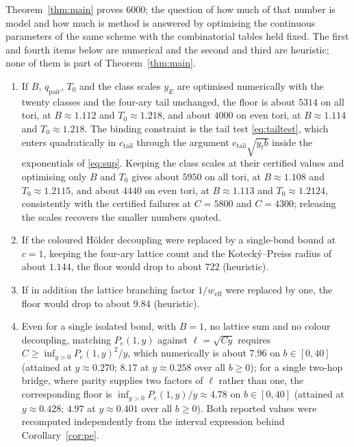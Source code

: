 \documentclass[11pt]{article}
\theoremstyle{plain}
\theoremstyle{definition}
\begin{document}
Theorem~\ref{thm:main} proves $6000$; the question of how much of that number is
model and how much is method is answered by optimising the continuous parameters of
the same scheme with the combinatorial tables held fixed. The first and fourth items
below are numerical and the second and third are heuristic; none of them is part of
Theorem~\ref{thm:main}.

\begin{enumerate}
\item If $B$, $q_{\mathrm{pair}}$, $T_0$ and the class scales $y_E$ are optimised
numerically with the twenty classes and the four-ary tail unchanged, the floor is
about $5314$ on all tori, at $B\approx1.112$ and $T_0\approx1.218$, and about $4000$
on even tori, at $B\approx1.114$ and $T_0\approx1.218$. The binding constraint is the
tail test \eqref{eq:tailtest}, which enters quadratically in $c_{\mathrm{tail}}$
through the argument $c_{\mathrm{tail}}\sqrt{y_tb}$ inside the exponentials of
\eqref{eq:sup}. Keeping the class scales at their certified values and optimising
only $B$ and $T_0$ gives about $5950$ on all tori, at $B\approx1.108$ and
$T_0\approx1.2115$, and about $4440$ on even tori, at $B\approx1.113$ and
$T_0\approx1.2124$, consistently with the certified failures at $C=5800$ and
$C=4300$; releasing the scales recovers the smaller numbers quoted.
\item If the coloured H\"older decoupling were replaced by a single-bond bound at
$c=1$, keeping the four-ary lattice count and the Koteck\'y--Preiss radius of about
$1.144$, the floor would drop to about $722$ (heuristic).
\item If in addition the lattice branching factor $1/w_{\mathrm{eff}}$ were replaced
by one, the floor would drop to about $9.84$ (heuristic).
\item Even for a single isolated bond, with $B=1$, no lattice sum and no colour
decoupling, matching $P_e(1,y)$ against $\ell=\sqrt{Cy}$ requires
$C\ge\inf_{y>0}P_e(1,y)^{2}/y$, which numerically is about $7.96$ on $b\in[0,40]$
(attained at $y\approx0.270$; $8.17$ at $y\approx0.258$ over all $b\ge0$); for a
single two-hop bridge, where parity supplies two factors of $\ell$ rather than one,
the corresponding floor is $\inf_{y>0}P_e(1,y)/y\approx4.78$ on $b\in[0,40]$
(attained at $y\approx0.428$; $4.97$ at $y\approx0.401$ over all $b\ge0$). Both
reported values were recomputed independently from the interval expression behind
Corollary~\ref{cor:pe}.
\end{enumerate}
\end{document}
